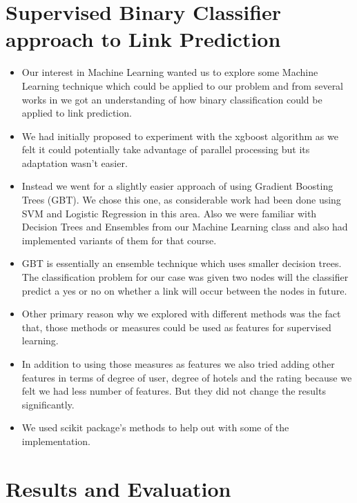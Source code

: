 \documentclass[letterpaper,twocolumn,11pt]{article}
\begin{document}
\section{Supervised Binary Classifier approach to Link Prediction}

\begin{itemize}
\item Our interest in Machine Learning wanted us to explore some Machine Learning technique which could be applied to our problem and from several works in \cite{one,five,seven} we got an understanding of how binary classification could be applied to link prediction.

\item We had initially proposed to experiment with the xgboost algorithm as we felt it could potentially take advantage of parallel processing but its adaptation wasn't easier.

\item Instead we went for a slightly easier approach of using Gradient Boosting Trees (GBT). We chose this one, as considerable work had been done using SVM and Logistic Regression in this area. Also we were familiar with Decision Trees and Ensembles from our Machine Learning class and also had implemented variants of them for that course.

\item GBT is essentially an ensemble technique which uses smaller decision trees. The classification problem for our case was given two nodes will the classifier predict a yes or no on whether a link will occur between the nodes in future.

\item Other primary reason why we explored with different methods was the fact that, those methods or measures could be used as features for supervised learning.

\item In addition to using those measures as features we also tried adding other features in terms of degree of user, degree of hotels and the rating because we felt we had less number of features. But they did not change the results significantly.

\item We used scikit package's methods to help out with some of the implementation.
\end{itemize}

\section{ Results and Evaluation}
\end{document}
